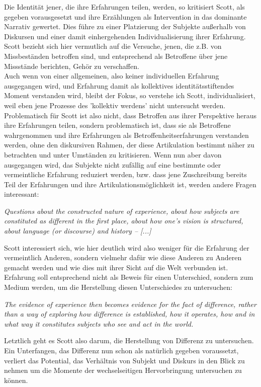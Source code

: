 \noindent Die Identität jener, die ihre Erfahrungen teilen, werden, so kritisiert Scott,
als gegeben vorausgesetzt und ihre Erzählungen als Intervention in das
dominante Narrativ gewertet. Dies führe zu einer Platzierung der Subjekte
außerhalb von Diskursen und einer damit einhergehenden Individualisierung ihrer
Erfahrung. Scott bezieht sich hier vermutlich auf die Versuche, jenen, die z.B.
von Missbeständen betroffen sind, und entsprechend als Betroffene über jene
Missstände berichten, Gehör zu verschaffen. \\
Auch wenn von einer allgemeinen,
also keiner individuellen Erfahrung ausgegangen wird, und Erfahrung damit als
kollektives identitätsstiftendes Moment verstanden wird, bleibt der Fokus, so
verstehe ich Scott, individualisiert, weil eben jene Prozesse des 'kollektiv
werdens' nicht untersucht werden.\\
Problematisch für Scott ist also nicht, dass
Betroffen aus ihrer Perspektive heraus ihre Erfahrungen teilen, sondern
problematisch ist, dass sie als Betroffene wahrgenommen und ihre Erfahrungen
als Betroffenheitserfahrungen verstanden werden, ohne den diskursiven Rahmen,
der diese Artikulation bestimmt näher zu betrachten und unter Umständen zu
kritisieren. Wenn nun aber davon ausgegangen wird, das Subjekte nicht zufällig
auf eine bestimmte oder vermeintliche Erfahrung reduziert werden, bzw. dass
jene Zuschreibung bereits Teil der Erfahrungen und ihre
Artikulationsmöglichkeit ist, werden andere Fragen interessant: 
\begin{myenv}
 \textit{\glqq Questions about the constructed nature of experience, about how
 subjects are constituted as different in the first place, about how one's
vision is structured, about language (or discourse) and history – [...]\grqq\footnotemark}
\end{myenv}
Scott interessiert sich, wie hier deutlich wird also weniger für die Erfahrung
der vermeintlich Anderen, sondern vielmehr dafür wie diese Anderen zu Anderen
gemacht werden und wie dies mit ihrer Sicht auf die Welt verbunden ist.
Erfahrung soll entsprechend nicht als Beweis für einen Unterschied, sondern zum
Medium werden, um die Herstellung diesen Unterschiedes zu untersuchen:
\begin{myenv}
 \textit{\glqq 
  The evidence of experience then becomes evidence for the fact of difference, rather than a way of exploring how difference is established, how it operates, how and in what way it constitutes subjects who see and act in the world.\grqq}\footnotemark {}
\end{myenv}
Letztlich geht es Scott also darum, die Herstellung von Differenz zu
untersuchen. Ein Unterfangen, das Differenz nun schon als natürlich gegeben
voraussetzt, verliert das Potential, das Verhältnis von Subjekt und Diskurs in
den Blick zu nehmen um die Momente der wechselseitigen Hervorbringung
untersuchen zu können. \\

